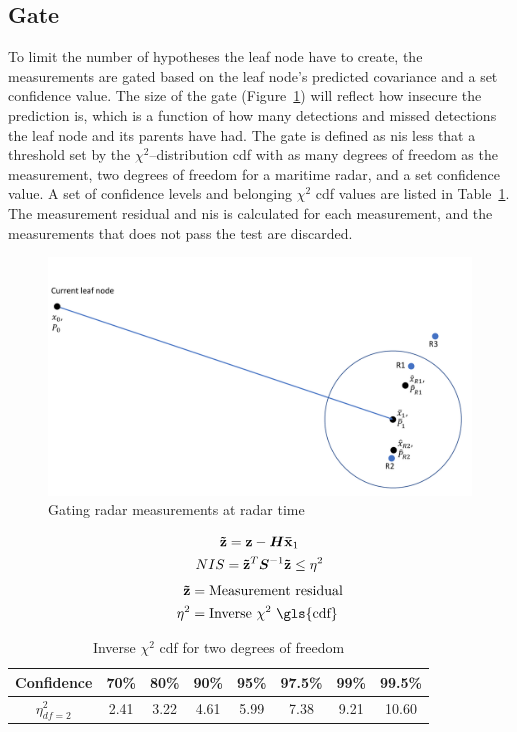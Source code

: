 \subsection{Gate}
To limit the number of hypotheses the leaf node have to create, the measurements are gated based on the leaf node's predicted covariance and a set confidence value. The size of the gate (Figure~\ref{fig:gating_radar_at_radar_time}) will reflect how insecure the prediction is, which is a function of how many detections and missed detections the leaf node and its parents have had. The gate is defined as \gls{nis} less that a threshold set by the \(\chi^2\)--distribution \gls{cdf} with as many degrees of freedom as the measurement, two degrees of freedom for a maritime radar, and a set confidence value. A set of confidence levels and belonging \(\chi^2\) \gls{cdf} values are listed in Table~\ref{tab:chi_square}. The measurement residual and \gls{nis} is calculated for each measurement, and the measurements that does not pass the test are discarded.
\begin{figure}
\centering
\includegraphics[width = .8\textwidth]{Figures/radar_gating.pdf}
\caption{Gating radar measurements at radar time}\label{fig:gating_radar_at_radar_time}
\end{figure}
\begin{equation}\label{eq:gate}
\begin{gathered}
\boldsymbol{\mathbf{\tilde{z}}} = \boldsymbol{\mathbf{z}} - \bm{H}\boldsymbol{\mathbf{\bar{x}}}_1 \\
NIS = \boldsymbol{\mathbf{\tilde{z}}}^T	\bm{S}^{-1} \boldsymbol{\mathbf{\tilde{z}}} \leq \eta^2
\end{gathered}
\end{equation}
\begin{equation*}
\begin{split}
\V{\tilde{z}}	&= \text{Measurement residual} \\
\eta^2 			&= \text{Inverse \(\chi^2\) \gls{cdf}} \\
\end{split}
\end{equation*}
\begin{table}
\centering
\begin{tabular}{c c c c c c c c}
Confidence 	& 70\% 	& 80\% 	& 90\% 	& 95\% 	& 97.5\% 	& 99\% 	& 99.5\% \\ 
\midrule
\(\eta^2_{df=2}\) 	& 2.41 	& 3.22 	& 4.61 	& 5.99 	& 7.38 		& 9.21 	& 10.60
\end{tabular}\caption{Inverse \(\chi^2\) \gls{cdf} for two degrees of freedom}
~\label{tab:chi_square}
\end{table}

